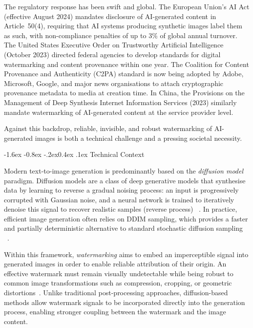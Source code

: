 \documentclass[10pt,twocolumn]{article}
\makeatletter
\renewcommand\subsection{\@startsection{subsection}{2}{\z@}%
  {-1.6ex \@plus -0.8ex \@minus -.2ex}{0.4ex \@plus .1ex}%
  {\normalfont\normalsize\itshape}}
\makeatother
\begin{document}
The regulatory response has been swift and global.
The European Union's AI Act (effective August 2024) mandates disclosure
of AI-generated content in Article~50(4), requiring that AI systems
producing synthetic images label them as such, with non-compliance
penalties of up to 3\% of global annual turnover.
The United States Executive Order on Trustworthy Artificial Intelligence
(October 2023) directed federal agencies to develop standards for digital
watermarking and content provenance within one year.
The Coalition for Content Provenance and Authenticity (C2PA) standard
is now being adopted by Adobe, Microsoft, Google, and major news
organisations to attach cryptographic provenance metadata to media at
creation time.
In China, the Provisions on the Management of Deep Synthesis Internet
Information Services (2023) similarly mandate watermarking of
AI-generated content at the service provider level.

Against this backdrop, reliable, invisible, and robust watermarking
of AI-generated images is both a technical challenge and a pressing
societal necessity.

\subsection{Technical Context}

Modern text-to-image generation is predominantly based on the
\textit{diffusion model} paradigm. Diffusion models are a class of deep
generative models that synthesise data by learning to reverse a gradual
noising process: an input is progressively corrupted with Gaussian noise,
and a neural network is trained to iteratively denoise
this signal to recover realistic samples (reverse process)
~\cite{10081412}. In practice, efficient image generation often relies
on DDIM sampling, which provides a faster and partially deterministic
alternative to standard stochastic diffusion sampling
~\cite{song2020ddim}.

Within this framework, \textit{watermarking} aims to embed an
imperceptible signal into generated images in order to enable reliable
attribution of their origin. An effective watermark must remain visually
undetectable while being robust to common image transformations such as
compression, cropping, or geometric distortions~\cite{NEURIPS2024}.
Unlike traditional post-processing approaches, diffusion-based methods
allow watermark signals to be incorporated directly into the generation
process, enabling stronger coupling between the watermark and the image
content.
\end{document}
